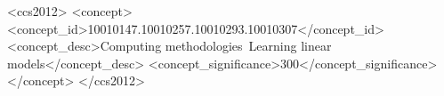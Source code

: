 \documentclass[manuscript,screen]{acmart}
\begin{document}

\begin{CCSXML}
<ccs2012>
   <concept>
       <concept_id>10010147.10010257.10010293.10010307</concept_id>
       <concept_desc>Computing methodologies~Learning linear models</concept_desc>
       <concept_significance>300</concept_significance>
       </concept>
 </ccs2012>
\end{CCSXML}



\end{document}
